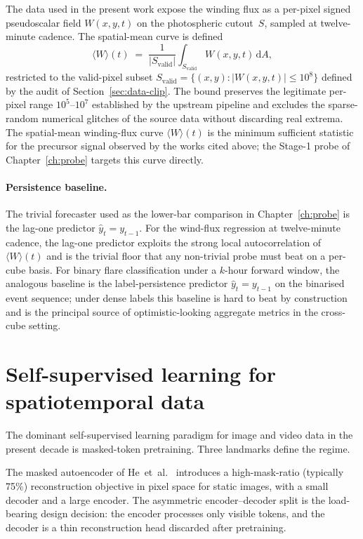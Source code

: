 The data used in the present work expose the winding flux as a
per-pixel signed pseudoscalar field $W(x, y, t)$ on the
photospheric cutout~$S$, sampled at twelve-minute cadence. The
spatial-mean curve is defined
\begin{equation}
\label{eq:spatial-mean-winding}
\langle W \rangle (t) \;=\;
\frac{1}{|S_{\text{valid}}|}
\int_{S_{\text{valid}}} W(x, y, t) \, \mathrm{d}A,
\end{equation}
restricted to the valid-pixel subset
$S_{\text{valid}} = \{(x, y) : |W(x, y, t)| \le 10^{8}\}$ defined by
the audit of Section~\ref{sec:data-clip}. The bound preserves the
legitimate per-pixel range $10^{5}$--$10^{7}$ established by the
upstream pipeline and excludes the sparse-random numerical glitches
of the source data without discarding real extrema. The
spatial-mean winding-flux curve $\langle W \rangle(t)$ is the
minimum sufficient statistic for the precursor signal observed by
the works cited above; the Stage-1 probe of
Chapter~\ref{ch:probe} targets this curve directly.

\paragraph{Persistence baseline.} The trivial forecaster used as the
lower-bar comparison in Chapter~\ref{ch:probe} is the lag-one
predictor $\hat{y}_{t} = y_{t-1}$. For the wind-flux regression at
twelve-minute cadence, the lag-one predictor exploits the strong
local autocorrelation of $\langle W \rangle(t)$ and is the trivial
floor that any non-trivial probe must beat on a per-cube basis. For
binary flare classification under a $k$-hour forward window, the
analogous baseline is the label-persistence predictor
$\hat{y}_{t} = y_{t-1}$ on the binarised event sequence; under
dense labels this baseline is hard to beat by construction and is
the principal source of optimistic-looking aggregate metrics in
the cross-cube setting.

\section{Self-supervised learning for spatiotemporal data}
\label{sec:bg-ssl}

The dominant self-supervised learning paradigm for image and video
data in the present decade is masked-token pretraining. Three
landmarks define the regime.

The masked autoencoder of He~et~al.~\cite{he2022mae} introduces a
high-mask-ratio (typically 75\%) reconstruction objective in pixel
space for static images, with a small decoder and a large encoder.
The asymmetric encoder--decoder split is the load-bearing design
decision: the encoder processes only visible tokens, and the
decoder is a thin reconstruction head discarded after pretraining.

